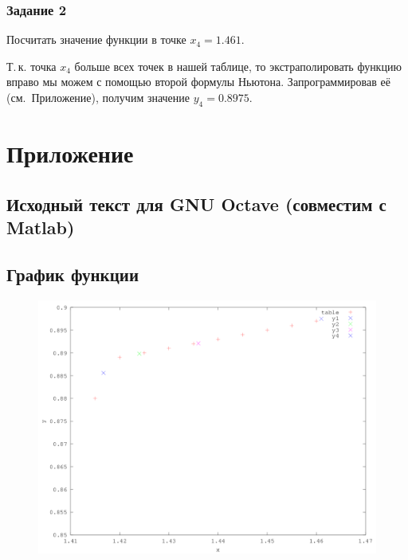 \documentclass[a4paper,10pt,notitlepage,pdftex,headsepline]{scrartcl}
\begin{document}
\subsubsection{Задание 2}
Посчитать значение функции в точке $x_4 = 1.461$.

Т.\,к. точка $x_4$ больше всех точек в нашей таблице, то экстраполировать функцию вправо мы можем с помощью второй формулы Ньютона. Запрограммировав её (см.~Приложение), получим значение $y_4 = 0.8975$.
\newpage
\section*{Приложение}
\subsection*{Исходный текст для GNU Octave (совместим с Matlab)}
\begin{small}
\end{small}
\newpage
\subsection*{График функции}
\begin{figure}[hc]
\includegraphics[scale=0.75]{1.png}
\end{figure}
\end{document}
